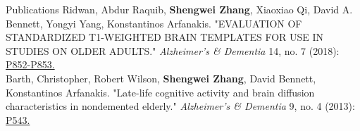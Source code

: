 \documentclass{resume} %
\begin{document}
\begin{rSection}{Publications}
	Ridwan, Abdur Raquib, {\bf Shengwei Zhang}, Xiaoxiao Qi, David A. Bennett, Yongyi Yang, Konstantinos Arfanakis. "EVALUATION OF STANDARDIZED T1-WEIGHTED BRAIN TEMPLATES FOR USE IN STUDIES ON OLDER ADULTS." {\em Alzheimer's \& Dementia} 14, no. 7 (2018): \href{https://doi.org/10.1016/j.jalz.2018.06.1084}{P852-P853.}\\
	Barth, Christopher, Robert Wilson, {\bf Shengwei Zhang}, David Bennett, Konstantinos Arfanakis. "Late-life cognitive activity and brain diffusion characteristics in nondemented elderly." {\em Alzheimer's \& Dementia} 9, no. 4 (2013): \href{http://dx.doi.org/10.1016/j.jalz.2013.04.298}{P543.}\\


\end{rSection}
\end{document}
